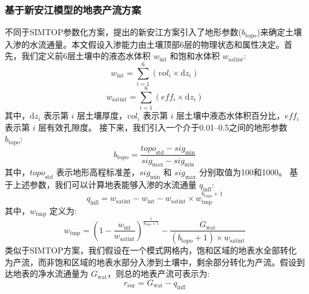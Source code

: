 \subsubsection{基于新安江模型的地表产流方案}
不同于SIMTOP参数化方案，\cite{RENJUN1992371}提出的新安江方案引入了地形参数($b_\text{topo}$)来确定土壤入渗的水流通量。本文假设入渗能力由土壤顶部6层的物理状态和属性决定。首先，我们定义前6层土壤中的液态水体积 $w_{\mathrm{{int}}}$ 和饱和水体积 $w_{\mathrm{{satint}}}$:
\begin{equation}
w_{\mathrm{{int}}} = \sum_{i=1}^{6}\left( {vol}_{i} \times {{\mathrm {d}} z}_{i} \right)
\end{equation}
\begin{equation}
w_{\mathrm{{satint}}} = \sum_{i=1}^{6}\left( {eff}_{i} \times {{\mathrm {d}} z}_{i} \right)
\end{equation}
其中，${{\mathrm {d}} z}_{i}$ 表示第 $i$ 层土壤厚度，${vol}_{i}$ 表示第 $i$ 层土壤中液态水体积百分比，${eff}_{i}$ 表示第 $i$ 层有效孔隙度。
接下来，我们引入一个介于0.01--0.5之间的地形参数 $b_\text{topo}$:
\begin{equation}
b_\text{topo}=\frac{{topo}_\text{std}-{sig}_\text{min}}{{sig}_\text{max}-{sig}_\text{min}}
\end{equation}
其中，${topo}_\text{std}$ 表示地形高程标准差，${sig}_\text{min}$ 和 ${sig}_\text{max}$ 分别取值为100和1000。
基于上述参数，我们可以计算地表能够入渗的水流通量 $q_{\mathrm{infl}}$:
\begin{equation}
q_{\mathrm{infl}}=w_{\mathrm{{satint}}}-w_{\mathrm{{int}}}-w_{\mathrm{{satint}}} \times w_{\mathrm{{tmp}}}^{b_\text{topo}+1}
\end{equation}
其中，$w_\text{tmp}$ 定义为:
\begin{equation}
w_\text{tmp}=\left(1-\frac{w_\text{int}}{w_\text{satint}}\right)^\frac{1}{b_\text{topo}+1}-\frac{G_\text{wat}}{\left(b_\text{topo}+1\right)\times w_\text{satint}} 
\end{equation}
类似于SIMTOP方案，我们假设在一个模式网格内，饱和区域的地表水全部转化为产流，而非饱和区域的地表水部分入渗到土壤中，剩余部分转化为产流。假设到达地表的净水流通量为 $G_\text{wat}$，则总的地表产流可表示为:
\begin{equation}
r_\text{sur}=G_\text{wat}-q_{\mathrm{infl}}
\end{equation}

